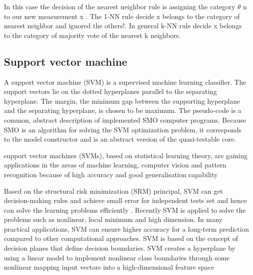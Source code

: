 In this case the decision of the nearest neighbor rule is assigning the category $\theta$ n to our new measurement x .
The 1-NN rule decide x belongs to the category of nearest neighbor and ignored the others!.
In general k-NN rule decide x belongs to the category of majority vote of the nearest k neighbors.



\subsection{Support vector machine}
A support vector machine (SVM)  is a supervised machine learning classifier. The support vectors lie on the dotted hyperplanes parallel to the separating hyperplane. The margin, the minimum gap between the supporting hyperplane and the separating hyperplane, is chosen to be maximum. The pseudo-code is a common, abstract description of implemented SMO computer programs. Because SMO is an algorithm for solving the SVM optimization problem, it corresponds to the model constructor and is an abstract version of the quasi-testable core.\cite{Nakajima2016}


support vector machines (SVMs), based on statistical learning theory, are gaining applications in the areas of machine learning, computer vision and pattern recognition because of high accuracy and good generalisation capability

Based on the structural risk minimization (SRM) principal, SVM can get decision-making rules and achieve small error for independent tests set and hence can solve the learning problems efficiently \cite{svm2008}. Recently SVM is applied to solve the problems such as nonlinear, local minimum and high dimension. In many practical applications, SVM can ensure higher accuracy for a long-term prediction compared to other computational approaches.
SVM is based on the concept of decision planes that define decision boundaries. SVM creates a hyperplane by using a linear model to implement nonlinear class boundaries through some nonlinear mapping input vectors into a high-dimensional feature space \cite{SAMANTA2003657} 

